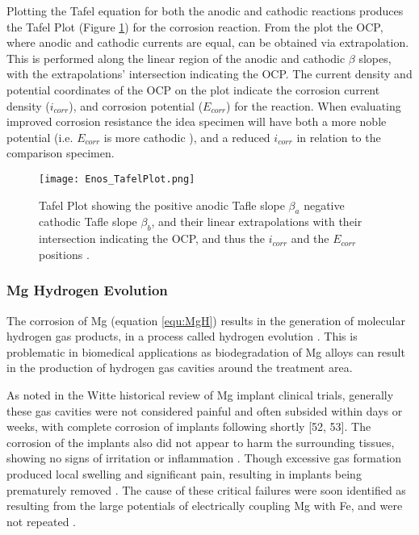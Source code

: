\documentclass[a4paper,12pt,oneside]{report}%
\begin{document}
Plotting the Tafel equation for both the anodic and cathodic reactions produces the Tafel Plot (Figure \ref{fig:EnosTafel}) for the corrosion reaction. From the plot the OCP, where anodic and cathodic currents are equal, can be obtained via extrapolation. This is performed along the linear region of the anodic and cathodic $\beta$ slopes, with the extrapolations' intersection indicating the OCP. The current density and potential coordinates of the OCP on the plot indicate the corrosion current density ($i_{corr}$), and corrosion potential ($E_{corr}$) for the reaction. When evaluating improved corrosion resistance the idea specimen will have both a more noble potential (i.e. $E_{corr}$ is more cathodic ), and a reduced $i_{corr}$ in relation to the comparison specimen.

\begin{figure}[htbp]
	\centering
	\texttt{[image: Enos\_TafelPlot.png]}
	\caption{Tafel Plot showing the positive anodic Tafle slope $\beta_{a}$ negative cathodic Tafle slope $\beta_{b}$, and their linear extrapolations with their intersection indicating the OCP, and thus the $i_{corr}$ and the $E_{corr}$ positions \cite{Enos1997}.}
	\label{fig:EnosTafel}
\end{figure}

\subsubsection{Mg Hydrogen Evolution}
The corrosion of Mg (equation \ref{equ:MgH}) results in the generation of molecular hydrogen gas products, in a process called hydrogen evolution \cite{Zberg2009}. This is problematic in biomedical applications as biodegradation of Mg alloys can result in the production of hydrogen gas cavities around the treatment area. 

As noted in the Witte \cite{Witte2010} historical review of Mg implant clinical trials, generally these gas cavities were not considered painful and often subsided within days or weeks, with complete corrosion of implants following shortly [52, 53]. The corrosion of the implants also did not appear to harm the surrounding tissues, showing no signs of irritation or inflammation \cite{Verbrugge1933}. Though excessive gas formation produced local swelling and significant pain, resulting in implants being prematurely removed \cite{Lambotte1932}. The cause of these critical failures were soon identified as resulting from the large potentials of electrically coupling Mg with Fe, and were not repeated \cite{Lambotte1932}. 
\end{document}
